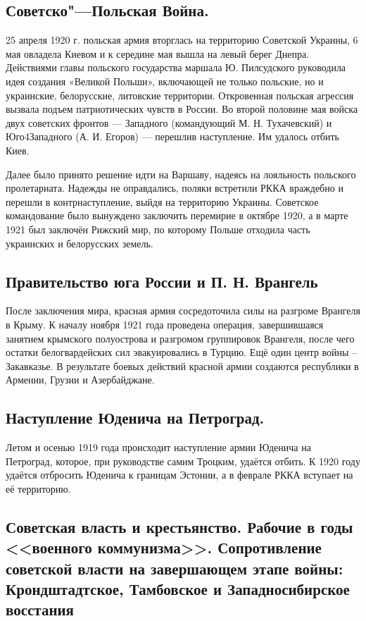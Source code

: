 \subsection{Советско"---Польская Война.}
25 апреля 1920 г. польская армия вторглась на территорию Советской Украины, 6 мая овладела Киевом и к середине мая вышла на левый берег Днепра. Действиями главы польского государства маршала Ю. Пилсудского руководила идея создания «Великой Польши», включающей не только польские, но и украинские, белорусские, литовские территории. Откровенная польская агрессия вызвала подъем патриотических чувств в России. Во второй половине мая войска двух советских фронтов — Западного (командующий М. Н. Тухачевский) и Юго4Западного (А. И. Егоров) — перешлив наступление. Им удалось отбить Киев.

Далее было принято решение идти на Варшаву, надеясь на лояльность польского пролетариата. Надежды не оправдались, поляки встретили РККА враждебно и перешли в контрнаступление, выйдя на территорию Украины. Советское командование было вынуждено заключить перемирие в октябре 1920, а в марте 1921 был заключён Рижский мир, по которому Польше отходила часть украинских и белорусских земель.

\subsection{Правительство юга России и П. Н. Врангель}

После заключения мира, красная армия сосредоточила силы на разгроме Врангеля в Крыму. К началу ноября 1921 года проведена операция, завершившаяся занятием крымского полуострова и разгромом группировок Врангеля, после чего остатки белогвардейских сил эвакуировались в Турцию.
Ещё один центр войны – Закавказье. В результате боевых действий красной армии создаются республики в Армении, Грузии и Азербайджане.

\subsection{Наступление Юденича на Петроград.}
Летом и осенью 1919 года происходит наступление армии Юденича на Петроград, которое, при руководстве самим Троцким, удаётся отбить. К 1920 году удаётся отбросить Юденича к границам Эстонии, а в феврале РККА вступает на её территорию.

\subsection{Советская власть и крестьянство. Рабочие в годы <<военного коммунизма>>. Сопротивление советской власти на завершающем этапе войны: Крондштадтское, Тамбовское и Западносибирское восстания}

